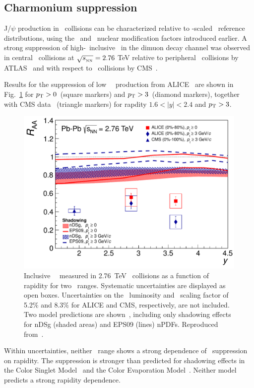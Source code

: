 \subsection{Charmonium suppression}

J/$\psi$ production in \PbPb\ collisions can be characterized relative to \Ncoll-scaled \pp\ reference
distributions, using the \Rcp\ and \Raa\ nuclear modification factors introduced earlier.
A strong suppression of high-\pT\ inclusive \jpsi\ in the dimuon decay channel 
was observed in central \PbPb\ collisions
at $\sqrt{s_{_{\rm NN}}} = 2.76$ TeV  relative to peripheral \PbPb\ collisions by ATLAS~\cite{Aad:2010aa}
and with respect to \pp\ collisions by CMS~\cite{Chatrchyan:2012np}.

Results for the suppression of low \pT\ \jpsi\ production from ALICE~\cite{Abelev:2012rv} are shown
in Fig.~\ref{fig:GR:raavsy} for $\mbox{$p_{\mathrm{T}}$} > 0$\GeVc\ (square markers) and
$\mbox{$p_{\mathrm{T}}$} > 3$\GeVc\ (diamond markers), together with CMS data~\cite{Chatrchyan:2012np} (triangle markers)
for rapdity $ 1.6 < |y| < 2.4 $ and $\mbox{$p_{\mathrm{T}}$} > 3$\GeVc.

\begin{figure}
\begin{center}
\includegraphics[width=0.49\linewidth]{qqbarfigures/RAAvsY_v7-eps-converted-to.pdf}
\caption{ \label{fig:GR:raavsy}  Inclusive \jpsi\ \Raa\ measured in 2.76~TeV \PbPb\
collisions as a function of  rapidity for two \pT\ ranges.
Systematic uncertainties are displayed as open boxes. 
Uncertainties on the \pp\ luminosity and \Taa\ scaling factor of
5.2\% and  8.3\% for ALICE and CMS, respectively, are not included.
Two model predictions are shown~\cite{Ferreiro:2011rw,Vogt:2010aa}, including only shadowing effects
for  nDSg (shaded areas) and EPS09 (lines) nPDFs. Reproduced from~\cite{Abelev:2012rv}.}
\end{center}
\end{figure}

Within uncertainties, neither \pT\ range shows a strong dependence of \jpsi\ suppression on rapidity.
The suppression is stronger than predicted for shadowing effects in the Color Singlet
Model~\cite{Ferreiro:2011rw} and the Color Evaporation Model~\cite{Vogt:2010aa}. Neither model
predicts a strong rapidity dependence.

